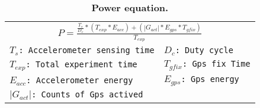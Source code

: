 \begin{table}[t]
	\begin{threeparttable}
		{\small
			\begin{tabularx}{\columnwidth}{ll}
				\toprule
				\multicolumn{2}{c}{$P = \frac{\frac{T_{s}}{D_{c}}*(T_{exp} * E_{acc}) +
				(\left|G_{act}\right | *
				E_{gps} * T_{gfix})}{T_{exp}} $}\\
				\texttt{$T_{s}$: Accelerometer sensing time} &
				\texttt{$D_{c}$: Duty cycle}\\
				\texttt{$T_{exp}$: Total experiment time} &
				\texttt{$T_{gfix}$: Gps fix Time}\\
				\texttt{$E_{acc}$: Accelerometer energy} &
				\texttt{$E_{gps}$: Gps energy} \\
				\multicolumn{2}{l}{\texttt{$\left|G_{act}\right|$: Counts of Gps
			actived}}\\
				\bottomrule
			\end{tabularx}
		}
		\caption{\textbf{Power equation.}}
		\label{table-power}
	\end{threeparttable}
\end{table}
